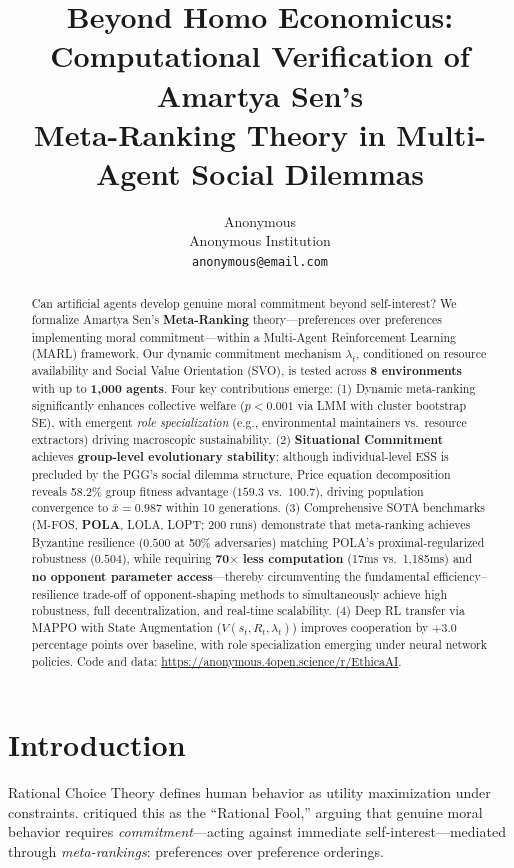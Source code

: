 \documentclass{article}
\title{Beyond Homo Economicus: Computational Verification of Amartya Sen's\\
Meta-Ranking Theory in Multi-Agent Social Dilemmas}
\author{
  Anonymous \\
  Anonymous Institution \\
  \texttt{anonymous@email.com}
}
\begin{document}
\maketitle

\begin{abstract}
Can artificial agents develop genuine moral commitment beyond self-interest?
We formalize Amartya Sen's \textbf{Meta-Ranking} theory---preferences over preferences implementing moral commitment---within a Multi-Agent Reinforcement Learning (MARL) framework.
Our dynamic commitment mechanism $\lambda_t$, conditioned on resource availability and Social Value Orientation (SVO), is tested across \textbf{8 environments} with up to \textbf{1,000 agents}.
Four key contributions emerge:
(1) Dynamic meta-ranking significantly enhances collective welfare ($p{<}0.001$ via LMM with cluster bootstrap SE), with emergent \emph{role specialization} (e.g., environmental maintainers vs.\ resource extractors) driving macroscopic sustainability.
(2) \textbf{Situational Commitment} achieves \textbf{group-level evolutionary stability}: although individual-level ESS is precluded by the PGG's social dilemma structure, Price equation decomposition reveals 58.2\% group fitness advantage ($159.3$ vs.\ $100.7$), driving population convergence to $\bar{x}=0.987$ within 10 generations.
(3) Comprehensive SOTA benchmarks (M-FOS, \textbf{POLA}, LOLA, LOPT; 200 runs) demonstrate that meta-ranking achieves Byzantine resilience ($0.500$ at 50\% adversaries) matching POLA's proximal-regularized robustness ($0.504$), while requiring \textbf{70$\times$ less computation} (17ms vs.\ 1,185ms) and \textbf{no opponent parameter access}---thereby circumventing the fundamental efficiency--resilience trade-off of opponent-shaping methods to simultaneously achieve high robustness, full decentralization, and real-time scalability.
(4) Deep RL transfer via MAPPO with State Augmentation ($V(s_t, R_t, \lambda_t)$) improves cooperation by $+3.0$ percentage points over baseline, with role specialization emerging under neural network policies.
Code and data: \url{https://anonymous.4open.science/r/EthicaAI}.
\end{abstract}

\section{Introduction}

Rational Choice Theory defines human behavior as utility maximization under constraints.
\citet{sen1977rational} critiqued this as the ``Rational Fool,'' arguing that genuine moral behavior requires \textit{commitment}---acting against immediate self-interest---mediated through \textit{meta-rankings}: preferences over preference orderings.
\end{document}
